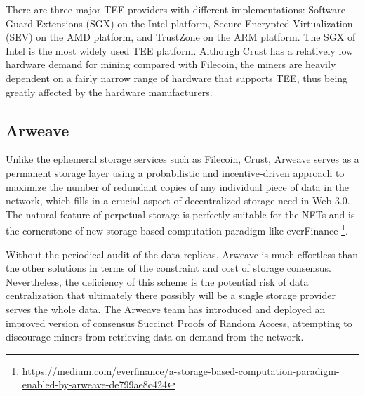 \documentclass[]{article}
\begin{document}
There are three major TEE providers with different implementations: Software Guard Extensions (SGX) on the Intel platform, Secure Encrypted Virtualization (SEV) on the AMD platform, and TrustZone on the ARM platform. The SGX of Intel is the most widely used TEE platform. Although Crust has a relatively low hardware demand for mining compared with Filecoin, the miners are heavily dependent on a fairly narrow range of hardware that supports TEE, thus being greatly affected by the hardware manufacturers.



\subsection{Arweave}

Unlike the ephemeral storage services such as Filecoin, Crust, Arweave\cite{arweave} serves as a permanent storage layer using a probabilistic and incentive-driven approach to maximize the number of redundant copies of any individual piece of data in the network, which fills in a crucial aspect of decentralized storage need in Web 3.0. The natural feature of perpetual storage is perfectly suitable for the NFTs and is the cornerstone of new storage-based computation paradigm like everFinance \footnote{\url{https://medium.com/everfinance/a-storage-based-computation-paradigm-enabled-by-arweave-de799ae8c424}}.

Without the periodical audit of the data replicas, Arweave is much effortless than the other solutions in terms of the constraint and cost of storage consensus. Nevertheless, the deficiency of this scheme is the potential risk of data centralization that ultimately there possibly will be a single storage provider serves the whole data. The Arweave team has introduced and deployed an improved version of consensus Succinct Proofs of Random Access, attempting to discourage miners from retrieving data on demand from the network.


\end{document}
